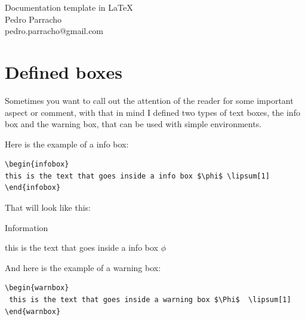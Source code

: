 \documentclass[12pt, a4paper,twoside]{article}
\title{\titleinfo}
\author{\authorinfo \\ \authoremail }
\date{}                                           %
\makeatletter
\def\mymaketitle{
\thispagestyle{plain}
\begin{center}
\vspace*{1.1cm}
\color{title_color}
\fontfamily{phv}\selectfont\LARGE{\titleinfo}\\[0.4cm]
\color{black}
\large{\authorinfo}\\[0.3cm]
\normalsize \authoremail
\end{center}
\vspace*{-0.5cm}
}
\newenvironment{infobox}[1][Information]{%
\bigskip
\renewcommand\logowidth{40pt}
\begin{bclogo}[logo=\bcinfo, couleur = LightSteelBlue1, epBarre = 4, couleurBarre = DeepSkyBlue3,ombre = true, couleurOmbre = Snow3,blur, noborder = true, marge=8, arrondi = 0.4,epOmbre = 0.18]{#1}%
}
{%
\renewcommand\logowidth{17pt}
\end{bclogo}%
}%
\newenvironment{warnbox}[1][Warning]{%
\renewcommand\logowidth{40pt}
\bigskip
\begin{bclogo}[logo=\bcattention, couleur = LightPink1, epBarre = 4, couleurBarre = Red1,ombre = true, couleurOmbre = Snow3,blur, noborder = true, marge=8,arrondi = 0.4, epOmbre = 0.15]{#1}%
}
{%
\renewcommand\logowidth{17pt}
\end{bclogo}%
}%
\newcommand{\titleinfo}{Documentation template in LaTeX}
\newcommand{\authorinfo}{Pedro  Parracho}
\newcommand{\authoremail}{ pedro.parracho@gmail.com}
\makeatother
\begin{document}
\mymaketitle
\thispagestyle{fancy}

\begin{abstract}
This is a template I wrote in order to have something to produce, nice,  small documents to in document stuff, mainly code.\\
With that goal, I went through a bunch of packages, and leave here some settings I liked to use in my documents.
The source of this document can also be useful for you to learn some tricks about how some of these packages.
In this document I use \emph{fullpage} for smaller margins, \emph{xcolor} to define nice colors, \emph{abstract} to change abstract settings, \emph{fancyhdr} for the headers, \emph{sectsty} to redefine section title font, \emph{bclogo} and \emph{pstricks} for nice colorful boxes,  \emph{rotating},  \emph{booktabs} and   \emph{multirow} for tables, \emph{subcaption} for images side-by-side and, \emph{listings} to include code in the document.
\end{abstract}

\section{Defined boxes}
Sometimes you want to call out the attention of the reader for some important aspect or comment, with that in mind I defined two  types of text boxes, the info box and the warning box, that can be used with simple environments. 


Here is the example of a info box: 

\begin{lstlisting}[language={[LaTeX]TeX}]
\begin{infobox} 
this is the text that goes inside a info box $\phi$ \lipsum[1]
\end{infobox}
\end{lstlisting}

That will look like this:

\begin{infobox} 
this is the text that goes inside a info box $\phi$ \lipsum[1]
\end{infobox}


And here is the example of a warning box:
\begin{lstlisting}[language={[LaTeX]TeX}]
\begin{warnbox} 
 this is the text that goes inside a warning box $\Phi$  \lipsum[1]
\end{warnbox}
\end{lstlisting}
\end{document}
